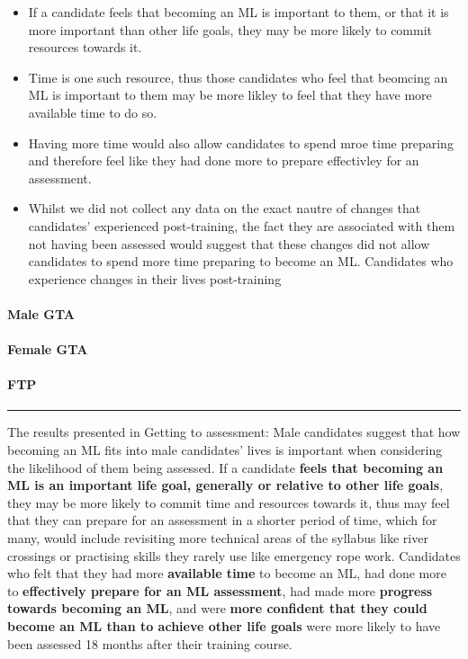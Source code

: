 \documentclass[a4paper,]{book}
\providecommand{\tightlist}{%
  \setlength{\itemsep}{0pt}\setlength{\parskip}{0pt}}
\let\oldparagraph\paragraph
\renewcommand{\paragraph}[1]{\oldparagraph{#1}\mbox{}}
\begin{document}
\begin{itemize}
\tightlist
\item
  If a candidate feels that becoming an ML is important to them, or that it is more important than other life goals, they may be more likely to commit resources towards it.
\item
  Time is one such resource, thus those candidates who feel that beomcing an ML is important to them may be more likley to feel that they have more available time to do so.
\item
  Having more time would also allow candidates to spend mroe time preparing and therefore feel like they had done more to prepare effectivley for an assessment.
\item
  Whilst we did not collect any data on the exact nautre of changes that candidates' experienced post-training, the fact they are associated with them not having been assessed would suggest that these changes did not allow candidates to spend more time preparing to become an ML.
  Candidates who experience changes in their lives post-training
\end{itemize}

\hypertarget{male-gta}{%
\paragraph{Male GTA}\label{male-gta}}

\hypertarget{female-gta}{%
\paragraph{Female GTA}\label{female-gta}}

\hypertarget{ftp}{%
\paragraph{FTP}\label{ftp}}

\begin{center}\rule{0.5\linewidth}{0.5pt}\end{center}

The results presented in Getting to assessment: Male candidates suggest that how becoming an ML fits into male candidates' lives is important when considering the likelihood of them being assessed. If a candidate \textbf{feels that becoming an ML is an important life goal, generally or relative to other life goals}, they may be more likely to commit time and resources towards it, thus may feel that they can prepare for an assessment in a shorter period of time, which for many, would include revisiting more technical areas of the syllabus like river crossings or practising skills they rarely use like emergency rope work. Candidates who felt that they had more \textbf{available time} to become an ML, had done more to \textbf{effectively prepare for an ML assessment}, had made more \textbf{progress towards becoming an ML}, and were \textbf{more confident that they could become an ML than to achieve other life goals} were more likely to have been assessed 18 months after their training course.
\end{document}
